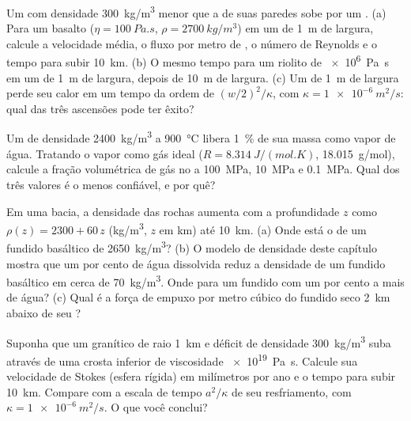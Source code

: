 \begin{exercise}[$\star\star$]\label{exo:b2:magma-emplacement:6}
Um  com densidade \qty{300}{kg/m^3} menor que a de suas paredes sobe por um .
(a) Para um basalto ($\eta = \qty{100}{Pa.s}$, $\rho = \qty{2700}{kg/m^3}$) em um 
de \qty{1}{m} de largura, calcule a velocidade média, o fluxo por metro de , o
número de Reynolds e o tempo para subir \qty{10}{km}. (b) O mesmo tempo para um riolito de
\qty{e6}{Pa.s} em um  de \qty{1}{m} de largura, depois de \qty{10}{m} de largura. (c) Um 
de \qty{1}{m} de largura perde seu calor em um tempo da ordem de $(w/2)^2/\kappa$, com $\kappa =
\qty{1e-6}{m^2/s}$: qual das três ascensões pode ter êxito?
\end{exercise}

\begin{exercise}[$\star\star$]\label{exo:b2:magma-emplacement:7}
Um  de densidade \qty{2400}{kg/m^3} a \qty{900}{\celsius} libera
\qty{1}{\percent} de sua massa como vapor de água. Tratando o vapor como gás ideal
($R = \qty{8.314}{J/(mol.K)}$, \qty{18.015}{g/mol}), calcule a fração volumétrica de
gás no  a \qty{100}{MPa}, \qty{10}{MPa} e \qty{0.1}{MPa}. Qual dos
três valores é o menos confiável, e por quê?
\end{exercise}

\begin{exercise}[$\star\star$]\label{exo:b2:magma-emplacement:8}
Em uma bacia, a densidade das rochas aumenta com a profundidade $z$ como $\rho(z) =
2300 + 60\,z$ (\unit{kg/m^3}, $z$ em \unit{km}) até \qty{10}{km}. (a) Onde está
o  de um fundido basáltico de \qty{2650}{kg/m^3}? (b) O
modelo de densidade deste capítulo mostra que um por cento de água dissolvida reduz
a densidade de um fundido basáltico em cerca de \qty{70}{kg/m^3}. Onde para um fundido com
um por cento a mais de água? (c) Qual é a força de empuxo por metro cúbico
do fundido seco \qty{2}{km} abaixo de seu ?
\end{exercise}

\begin{exercise}[$\star\star$]\label{exo:b2:magma-emplacement:9}
Suponha que um  granítico de raio \qty{1}{km} e déficit de densidade
\qty{300}{kg/m^3} suba através de uma crosta inferior de viscosidade \qty{e19}{Pa.s}. Calcule
sua velocidade de Stokes (esfera rígida) em milímetros por ano e o tempo para subir
\qty{10}{km}. Compare com a escala de tempo $a^2/\kappa$ de seu resfriamento, com $\kappa
= \qty{1e-6}{m^2/s}$. O que você conclui?
\end{exercise}

